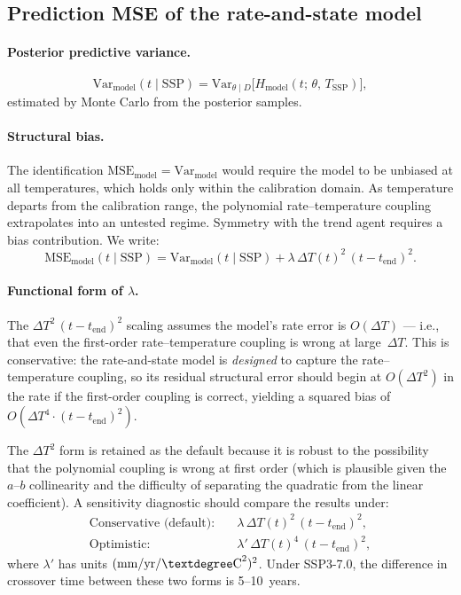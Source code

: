 \documentclass[11pt]{article}
\newcommand{\dT}{\Delta T}
\newcommand{\tend}{t_{\mathrm{end}}}
\newcommand{\MSEmodel}{\mathrm{MSE}_{\mathrm{model}}}
\begin{document}
\subsection{Prediction MSE of the rate-and-state model}
\label{sec:model_MSE}

\paragraph{Posterior predictive variance.}
\begin{equation}
  \mathrm{Var}_{\mathrm{model}}(t \mid \mathrm{SSP}) = \mathrm{Var}_{\theta \mid D}\big[H_{\mathrm{model}}(t;\,\theta,\,T_{\mathrm{SSP}})\big],
  \label{eq:var_model}
\end{equation}
estimated by Monte Carlo from the posterior samples.

\paragraph{Structural bias.}  The identification $\MSEmodel = \mathrm{Var}_{\mathrm{model}}$ would require the model to be unbiased at all temperatures, which holds only within the calibration domain.  As temperature departs from the calibration range, the polynomial rate--temperature coupling extrapolates into an untested regime.  Symmetry with the trend agent requires a bias contribution.  We write:
\begin{equation}
  \MSEmodel(t \mid \mathrm{SSP}) = \mathrm{Var}_{\mathrm{model}}(t \mid \mathrm{SSP}) + \lambda\,\dT(t)^2\,(t - \tend)^2.
  \label{eq:MSE_model}
\end{equation}

\paragraph{Functional form of $\lambda$.}  The $\dT^2\,(t - \tend)^2$ scaling assumes the model's rate error is $O(\dT)$ --- i.e., that even the first-order rate--temperature coupling is wrong at large~$\dT$.  This is conservative: the rate-and-state model is \emph{designed} to capture the rate--temperature coupling, so its residual structural error should begin at $O(\dT^2)$ in the rate if the first-order coupling is correct, yielding a squared bias of $O(\dT^4 \cdot (t - \tend)^2)$.

The $\dT^2$ form is retained as the default because it is robust to the possibility that the polynomial coupling is wrong at first order (which is plausible given the $a$--$b$ collinearity and the difficulty of separating the quadratic from the linear coefficient).  A sensitivity diagnostic should compare the results under:
\begin{align}
  \text{Conservative (default):} \quad & \lambda\,\dT(t)^2\,(t - \tend)^2, \label{eq:lambda_conservative} \\
  \text{Optimistic:} \quad & \lambda'\,\dT(t)^4\,(t - \tend)^2, \label{eq:lambda_optimistic}
\end{align}
where $\lambda'$ has units $({\rm mm/yr/\textdegree C}^2)^2$.  Under SSP3-7.0, the difference in crossover time between these two forms is 5--10~years.
\end{document}

